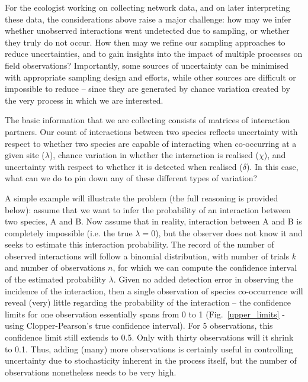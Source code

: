 \documentclass[12pt]{article}
\begin{document}
  For the ecologist working on collecting network data, and on later interpreting these data, the considerations above raise a major challenge: how may we infer whether unobserved interactions went undetected due to sampling, or whether they truly do not occur. How then may we refine our sampling approaches to reduce uncertainties, and to gain insights into the impact of multiple processes on field observations? Importantly, some sources of uncertainty can be minimised with appropriate sampling design and efforts, while other sources are difficult or impossible to reduce – since they are generated by chance variation created by the very process in which we are interested.


  The basic information that we are collecting consists of matrices of interaction partners. Our count of interactions between two species reflects uncertainty with respect to whether two species are capable of interacting when co-occurring at a given site ($\lambda$), chance variation in whether the interaction is realised ($\chi$),  and uncertainty with respect to whether it is detected when realised ($\delta$). In this case, what can we do to pin down any of these different types of variation?


  A simple example will illustrate the problem (the full reasoning is provided below): assume that we want to infer the probability of an interaction between two species, A and B. Now assume that in reality, interaction between A and B is completely impossible (i.e. the true $\lambda=0$), but the observer does not know it and seeks to estimate this interaction probability. The record of the number of observed interactions will follow a binomial distribution, with number of trials $k$ and number of observations $n$, for which we can compute the confidence interval of the estimated probability $\lambda$. Given no added detection error in observing the incidence of the interaction, then a single observation of species co-occurrence will reveal (very) little regarding the probability of the interaction – the confidence limits for one observation essentially spans from 0 to 1 (Fig.~\ref{upper_limits} - using Clopper-Pearson's true confidence interval). For 5 observations, this confidence limit still extends to 0.5. Only with thirty observations will it shrink to 0.1. Thus, adding (many) more observations is certainly useful in controlling uncertainty due to stochasticity inherent in the process itself, but the number of observations nonetheless needs to be very high. 
\end{document}
